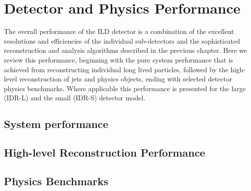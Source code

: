 \renewcommand{\fix}[1]{\textcolor{red}{\texttt{#1}}} %


\chapter{\label{chap:performance} Detector and Physics Performance}
\label{ild:sec:performance}
The overall performance of the ILD detector is a combination of the excellent
resolutions and efficiencies of the individual sub-detectors and the
sophisticated reconstruction and analysis algorithms described in the previous chapter.
Here we review this performance, beginning with the pure system performance that
is achieved from reconstructing individual long lived particles, followed by the high-level
reconstruction of jets and physics objects, ending with selected detector physics benchmarks.
Where applicable this performance is presented for the large (IDR-L) and the small (IDR-S)
detector model.

\section{\label{sec:system-performance} System performance}




\section{\label{sec:HLR-performance} High-level Reconstruction Performance}



\section{\label{sec:benchmarks} Physics Benchmarks}


